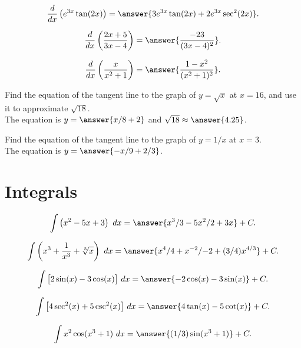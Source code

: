 \documentclass[handout]{ximera}
\begin{document}
\begin{problem}
\[\frac{d}{dx}\left(e^{3x} \tan(2x)\right) = \answer{3e^{3x} \tan(2x) + 2e^{3x}\sec^2(2x)}.\]
\end{problem}

\begin{problem}
\[\frac{d}{dx}\left(\frac{2x+5}{3x - 4}\right) = \answer{\frac{-23}{(3x-4)^2}}.\]

\[\frac{d}{dx}\left(\frac{x}{x^2 + 1}\right) = \answer{\frac{1 - x^2}{(x^2 + 1)^2}}.\]
\end{problem}

\begin{problem}
Find the equation of the tangent line to the graph of $y=\sqrt{x}$ at $x = 16$, and use it to approximate $\sqrt{18}$.\\
The equation is $y = \answer{x/8 + 2}$ and $\sqrt{18} \approx \answer{4.25}$.


\end{problem}

\begin{problem}
Find the equation of the tangent line to the graph of $y=1/x$ at $x = 3$.\\
The equation is $y = \answer{-x/9 +2/3}$.
\end{problem}


\section{Integrals}

\begin{problem}
\[\int\left(x^2 - 5x + 3  \right) \ dx = \answer{x^3/3 - 5x^2 /2 + 3x} + C.\]
\end{problem}

\begin{problem}
\[\int\left(x^3 + \frac{1}{x^3} + \sqrt[3]x  \right) \ dx = \answer{x^4/4 +x^{-2}/{-2} + 
(3/4)x^{4/3}} + C.\]
\end{problem}

\begin{problem}
\[\int\big[2\sin(x) - 3\cos(x)  \big] \ dx = \answer{-2\cos(x) -3\sin(x)} + C.\]
\end{problem}

\begin{problem}
\[\int\big[4\sec^2(x) + 5 \csc^2(x) \big] \ dx = \answer{4\tan(x) - 5 \cot(x)} + C.\]
\end{problem}

\begin{problem}
\[\int x^2 \cos(x^3 + 1) \ dx = \answer{(1/3) \sin(x^3 +1)} + C.\]
\end{problem}
\end{document}
